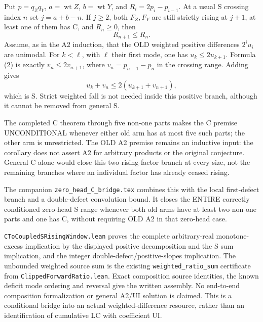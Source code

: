 \begin{corollary}
Put $p=q_Zq_Y$, $a=\operatorname{wt}Z$, $b=\operatorname{wt}Y$,
and $R_i=2p_i-p_{i-1}$. At a usual S crossing index $n$ set
$j=a+b-n$. If $j\ge2$, both $F_Z,F_Y$ are still strictly rising
at $j+1$, at least one of them has C, and $R_n\ge0$, then
\[
                         R_{n+1}\le R_n.                \tag{2}
\]
Assume, as in the A2 induction, that the OLD weighted positive
differences $2^iu_i$ are unimodal. For $k<\ell$, with $\ell$ their
first mode, one has $u_k\le2u_{k+1}$. Formula (2) is exactly
$v_n\le2v_{n+1}$, where $v_n=p_{n-1}-p_n$ in the crossing
range. Adding gives
\[
                    u_k+v_n\le2(u_{k+1}+v_{n+1}),
\]
which is S. Strict weighted fall is not needed inside this positive
branch, although it cannot be removed from general S.
\end{corollary}

The completed C theorem through five non-one parts makes the C premise
UNCONDITIONAL whenever either old arm has at most five such parts;
the other arm is unrestricted. The OLD A2 premise remains an inductive
input: the corollary does not assert A2 for arbitrary products or the
original conjecture. General C alone would close this two-rising-factor
branch at every size, not the remaining branches where an individual
factor has already ceased rising.

The companion \texttt{zero\_head\_C\_bridge.tex} combines this with the
local first-defect branch and a double-defect convolution bound. It
closes the ENTIRE correctly conditioned zero-head S range whenever
both old arms have at least two non-one parts and one has C, without
requiring OLD A2 in that zero-head case.

\texttt{CToCoupledSRisingWindow.lean} proves the complete arbitrary-real
monotone-excess implication by the displayed positive decomposition and
the S sum implication, and the integer double-defect/positive-slopes
implication. The unbounded weighted source sum is the existing
\texttt{weighted\_ratio\_sum} certificate from
\texttt{ClippedForwardRatio.lean}. Exact composition source identities,
the known deficit mode ordering and reversal give the written assembly.
No end-to-end composition formalization or general A2/UI solution is
claimed. This is a conditional bridge into an actual weighted-difference
resource, rather than an identification of cumulative LC with coefficient UI.
